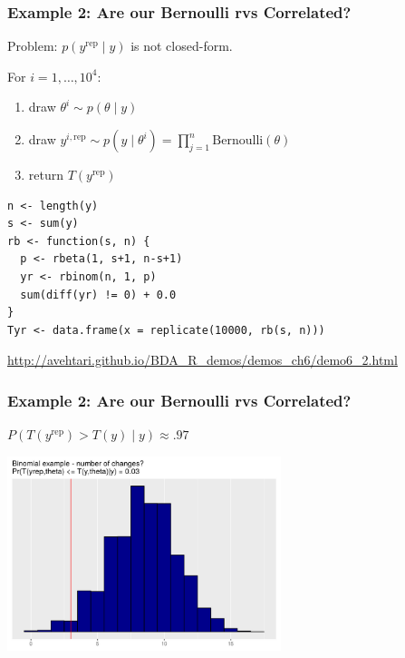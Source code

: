 \documentclass{beamer}
\begin{document}
\begin{frame}[fragile]
\frametitle{Example 2: Are our Bernoulli rvs Correlated?}

Problem: $p(y^{\text{rep}} \mid y)$ is not closed-form.
\newline

For $i=1,\ldots,  10^4$:
\begin{enumerate}
\item draw $\theta^i \sim p(\theta \mid y)$
\item draw $y^{i,\text{rep}} \sim p(y \mid \theta^i) = \prod_{j=1}^n \text{Bernoulli}(\theta)$
\item return $T(y^{\text{rep}})$
\end{enumerate}
\pause

\begin{verbatim}
n <- length(y)
s <- sum(y)
rb <- function(s, n) {
  p <- rbeta(1, s+1, n-s+1)
  yr <- rbinom(n, 1, p)
  sum(diff(yr) != 0) + 0.0
}
Tyr <- data.frame(x = replicate(10000, rb(s, n)))
\end{verbatim}

\url{http://avehtari.github.io/BDA_R_demos/demos_ch6/demo6_2.html}
\end{frame}

\begin{frame}[fragile]
\frametitle{Example 2: Are our Bernoulli rvs Correlated?}

$P(T(y^{\text{rep} } ) > T(y ) \mid y) \approx .97$

\begin{center}
\includegraphics[width=80mm]{switches_hist.png}
\end{center}


\end{frame}
\end{document}
